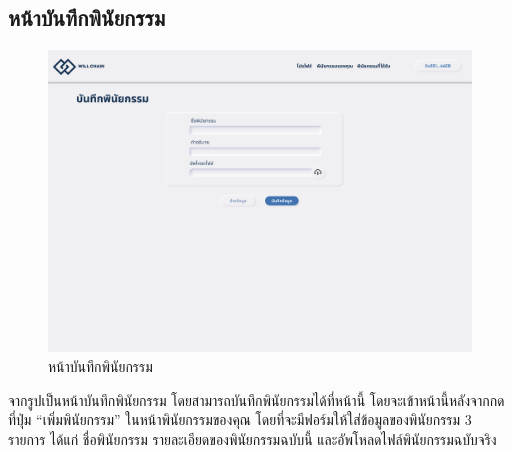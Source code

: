 \documentclass[12pt,oneside,openright,a4paper]{cpe-thai-project}
\begin{document}
\subsection{หน้าบันทึกพินัยกรรม}
		\begin{figure}[!thb]
			\centering
			\includegraphics[scale=0.2]{saveWill}
			\caption{หน้าบันทึกพินัยกรรม}
		\end{figure}
		\FloatBarrier
		\tab  จากรูปเป็นหน้าบันทึกพินัยกรรม โดยสามารถบันทึกพินัยกรรมได้ที่หน้านี้ โดยจะเข้าหน้านี้หลังจากกดที่ปุ่ม “เพิ่มพินัยกรรม” ในหน้าพินัยกรรมของคุณ โดยที่จะมีฟอร์มให้ใส่ข้อมูลของพินัยกรรม 3 รายการ ได้แก่ ชื่อพินัยกรรม รายละเอียดของพินัยกรรมฉบับนี้ และอัพโหลดไฟล์พินัยกรรมฉบับจริง
\end{document}
